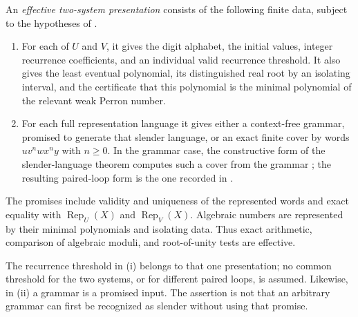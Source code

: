 \begin{definition}
  \label{def:effective-two-system-presentation}
  An \emph{effective two-system presentation} consists of the following
  finite data, subject to the hypotheses of
  .
  \begin{enumerate}[label=\textup{(\roman*)}]
    \item For each of \(U\) and \(V\), it gives the digit alphabet, the
      initial values, integer recurrence coefficients, and an individual
      valid recurrence threshold. It also gives the least eventual
      polynomial, its distinguished real root by an isolating interval, and
      the certificate that this polynomial is the minimal polynomial of the
      relevant weak Perron number.
    \item For each full representation language it gives either a
      context-free grammar, promised to generate that slender language, or
      an exact finite cover by words
      \(
        u v^n w x^n y
      \)
      with \(n\ge0\). In the grammar case, the constructive form of the
      slender-language theorem computes such a cover from the grammar
      \cite{LatteuxThierrin1983,Ilie1994}; the resulting paired-loop form is
      the one recorded in \cite[Theorem~7]{IlieRozenbergSalomaa2000}.
  \end{enumerate}
  The promises include validity and uniqueness of the represented words and
  exact equality with \(\operatorname{Rep}_U(X)\) and
  \(\operatorname{Rep}_V(X)\). Algebraic numbers are represented by their
  minimal polynomials and isolating data. Thus exact arithmetic, comparison
  of algebraic moduli, and root-of-unity tests are effective.
\end{definition}

The recurrence threshold in (i) belongs to that one presentation; no common
threshold for the two systems, or for different paired loops, is assumed.
Likewise, in (ii) a grammar is a promised input. The assertion is not that an
arbitrary grammar can first be recognized as slender without using that
promise.

